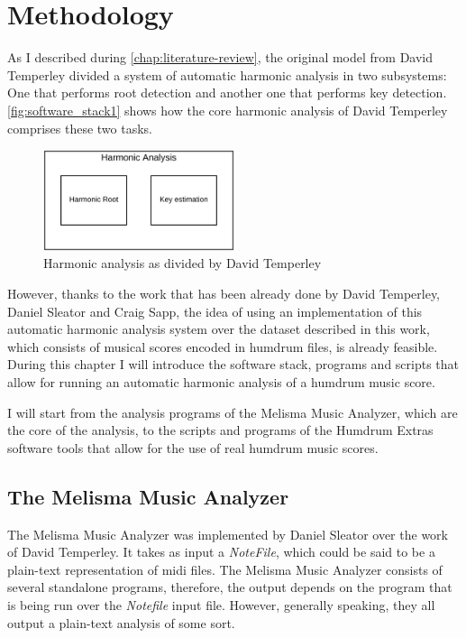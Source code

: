 \normallinespacing

\chapter{Methodology}
\label{chap:methodology}

As I described during \autoref{chap:literature-review}, the original model from David Temperley divided a system of automatic harmonic analysis in two subsystems: One that performs root detection and another one that performs key detection. \autoref{fig:software_stack1} shows how the core harmonic analysis of David Temperley comprises these two tasks.

\begin{figure}[ht]
  \centering
    \includegraphics[width=0.5\textwidth]{04-methodology/figures/1}
  \caption{Harmonic analysis as divided by David Temperley}
  \label{fig:software_stack1}
\end{figure}

However, thanks to the work that has been already done by David Temperley, Daniel Sleator and Craig Sapp, the idea of using an implementation of this automatic harmonic analysis system over the dataset described in this work, which consists of musical scores encoded in humdrum files, is already feasible. During this chapter I will introduce the software stack, programs and scripts that allow for running an automatic harmonic analysis of a humdrum music score.

I will start from the analysis programs of the Melisma Music Analyzer, which are the core of the analysis, to the scripts and programs of the Humdrum Extras software tools that allow for the use of real humdrum music scores.

\section{The Melisma Music Analyzer}
  The Melisma Music Analyzer was implemented by Daniel Sleator over the work of David Temperley. It takes as input a \emph{NoteFile}, which could be said to be a plain-text representation of midi files. The Melisma Music Analyzer consists of several standalone programs, therefore, the output depends on the program that is being run over the \emph{Notefile} input file. However, generally speaking, they all output a plain-text analysis of some sort.

